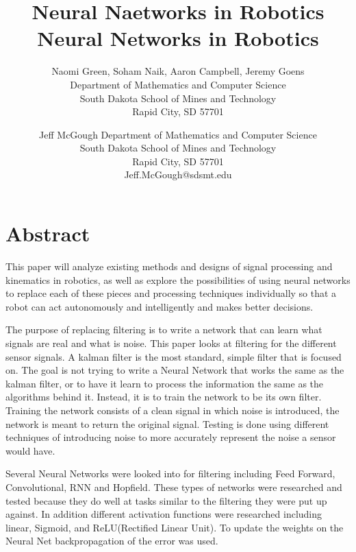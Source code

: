 \documentclass[12pt]{article}
\begin{document}
\pagestyle{plain}

\title{Neural Naetworks in Robotics}

\author{
Naomi Green, Soham Naik, Aaron Campbell, Jeremy Goens\\
Department of Mathematics and Computer Science\\
South Dakota School of Mines and Technology\\
Rapid City, SD 57701\\
\and
Jeff McGough
Department of Mathematics and Computer Science\\
South Dakota School of Mines and Technology\\
Rapid City, SD 57701\\
Jeff.McGough@sdsmt.edu
}

\title{ Neural Networks in Robotics}
\maketitle
\thispagestyle{empty}

\section*{\centering Abstract}
This paper will analyze existing methods and designs of signal processing and kinematics in robotics, as well as explore the possibilities of using neural networks to replace each of these pieces and processing techniques individually so that a robot can act autonomously and intelligently and makes better decisions. 

The purpose of replacing filtering is to write a network that can learn what signals are real and what is noise. This paper looks at filtering for the different sensor signals. A kalman filter is the most standard, simple filter that is focused on. The goal is not trying to write a Neural Network that works the same as the kalman filter, or to have it learn to process the information the same as the algorithms behind it. Instead, it is to train the network to be its own filter. Training the network consists of a clean signal in which noise is introduced, the network is meant to return the original signal. Testing is done using different techniques of introducing noise to more accurately represent the noise a sensor would have.

Several Neural Networks were looked into for filtering including Feed Forward, Convolutional, RNN and Hopfield. These types of networks were researched and tested because they do well at tasks similar to the filtering they were put up against. In addition different activation functions were researched including linear, Sigmoid, and ReLU(Rectified Linear Unit). To update the weights on the Neural Net backpropagation of the error was used.
\end{document}
